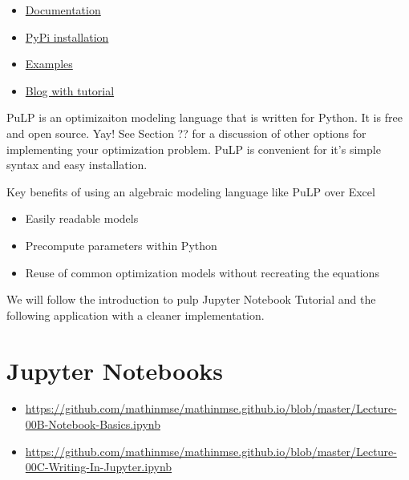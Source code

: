 \begin{resource}
\begin{itemize}
\item \href{https://coin-or.github.io/pulp/}{Documentation}
\item \href{https://pypi.org/project/PuLP/}{PyPi installation}
\item \href{https://github.com/coin-or/pulp/tree/master/examples}{Examples}
\item \href{https://benalexkeen.com/linear-programming-with-python-and-pulp-part-1/}{Blog with tutorial}
\end{itemize}
\end{resource}

PuLP is an optimizaiton modeling language that is written for Python.  It is free and open source.  Yay!   See Section ?? for a discussion of other options for implementing your optimization problem.
PuLP is convenient for it's simple syntax and easy installation.   
 
Key benefits of using an algebraic modeling language like PuLP over Excel
\begin{itemize}
\item Easily readable models
\item Precompute parameters within Python
\item Reuse of common optimization models without recreating the equations
\end{itemize}

We will follow the introduction to pulp Jupyter Notebook Tutorial and the following application with a cleaner implementation.





\section{Jupyter Notebooks}
\begin{resource}
\begin{itemize}
\item \url{https://github.com/mathinmse/mathinmse.github.io/blob/master/Lecture-00B-Notebook-Basics.ipynb}
\item \url{https://github.com/mathinmse/mathinmse.github.io/blob/master/Lecture-00C-Writing-In-Jupyter.ipynb}
\end{itemize}
\end{resource}

